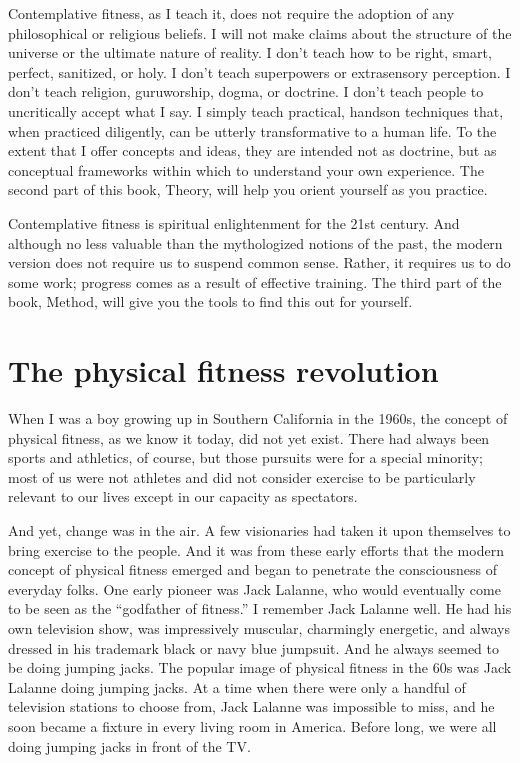 \documentclass[a5paper,10pt,english]{book}
\begin{document}
\sphinxAtStartPar
Contemplative fitness, as I teach it, does not require the adoption of
any philosophical or religious beliefs. I will not make claims about the
structure of the universe or the ultimate nature of reality. I don’t
teach how to be right, smart, perfect, sanitized, or holy. I don’t teach
super\sphinxhyphen{}powers or extra\sphinxhyphen{}sensory perception. I don’t teach religion,
guru\sphinxhyphen{}worship, dogma, or doctrine. I don’t teach people to uncritically
accept what I say. I simply teach practical, hands\sphinxhyphen{}on techniques that,
when practiced diligently, can be utterly transformative to a human
life. To the extent that I offer concepts and ideas, they are intended
not as doctrine, but as conceptual frameworks within which to understand
your own experience. The second part of this book, Theory, will help you
orient yourself as you practice.

\sphinxAtStartPar
Contemplative fitness is spiritual enlightenment for the 21st century.
And although no less valuable than the mythologized notions of the past,
the modern version does not require us to suspend common sense. Rather,
it requires us to do some work; progress comes as a result of effective
training. The third part of the book, Method, will give you the tools to
find this out for yourself.


\section{The physical fitness revolution}
\label{\detokenize{front-intro:the-physical-fitness-revolution}}
\sphinxAtStartPar
When I was a boy growing up in Southern California in the 1960s, the
concept of physical fitness, as we know it today, did not yet exist.
There had always been sports and athletics, of course, but those
pursuits were for a special minority; most of us were not athletes and
did not consider exercise to be particularly relevant to our lives
except in our capacity as spectators.

\sphinxAtStartPar
And yet, change was in the air. A few visionaries had taken it upon
themselves to bring exercise to the people. And it was from these early
efforts that the modern concept of physical fitness emerged and began to
penetrate the consciousness of everyday folks. One early pioneer was
Jack Lalanne, who would eventually come to be seen as the “godfather of
fitness.” I remember Jack Lalanne well. He had his own television show,
was impressively muscular, charmingly energetic, and always dressed in
his trademark black or navy blue jumpsuit. And he always seemed to be
doing jumping jacks. The popular image of physical fitness in the 60s
was Jack Lalanne doing jumping jacks. At a time when there were only a
handful of television stations to choose from, Jack Lalanne was
impossible to miss, and he soon became a fixture in every living room in
America. Before long, we were all doing jumping jacks in front of the
TV.
\end{document}
